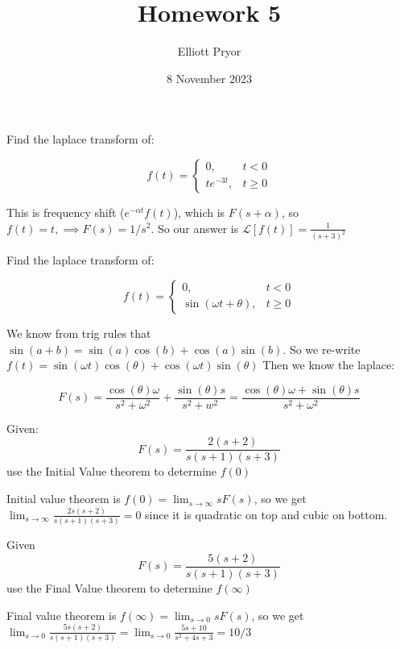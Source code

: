 \documentclass[11pt]{article}
\title{Homework 5}
\author{Elliott Pryor}
\date{8 November 2023}
\begin{document}
\maketitle

Find the laplace transform of:

$$
f(t) = \begin{cases}
    0, & t<0\\
    te^{-3t}, & t \geq 0
\end{cases}
$$
\soln

This is frequency shift ($e^{-\alpha t} f(t)$),
which is $F(s + \alpha)$, so $f(t) = t, \implies F(s) = 1/s^2$.
So our answer is $\mathcal{L}[f(t)] = \frac{1}{(s+3)^2}$


Find the laplace transform of:

$$
f(t) = \begin{cases}
    0, & t<0\\
    \sin(\omega t + \theta), & t \geq 0
\end{cases}
$$
\soln

We know from trig rules that $\sin(a + b) = \sin(a)\cos(b) + \cos(a) \sin(b)$.
So we re-write $f(t) = \sin(\omega t) \cos(\theta) + \cos(\omega t) \sin(\theta)$
Then we know the laplace:

$$
F(s) = \frac{\cos(\theta) \omega}{s^2 + \omega^2} + \frac{\sin(\theta) s}{s^2 + w^2} = 
\frac{\cos(\theta)\omega + \sin(\theta)s}{s^2 + \omega^2}
$$

Given:
$$
F(s) = \frac{2(s + 2)}{s (s+1) (s+3)}
$$
use the Initial Value theorem to determine $f(0)$
\soln

Initial value theorem is $f(0) = \lim_{s\to \infty} s F(s)$,
so we get $\lim_{s \to \infty} \frac{2s(s + 2)}{s (s+1) (s+3)} = 0$
since it is quadratic on top and cubic on bottom.










Given
$$
F(s) = \frac{5(s+2)}{s(s+1)(s+3)}
$$
use the Final Value theorem to determine $f(\infty)$
\soln

Final value theorem is $f(\infty) = \lim_{s\to 0} s F(s)$,
so we get \\
$\lim_{s \to 0} \frac{5s(s+2)}{s(s+1)(s+3)} = \lim_{s \to 0} \frac{5s + 10}{s^2 + 4s + 3} = 10/3$
\end{document}
